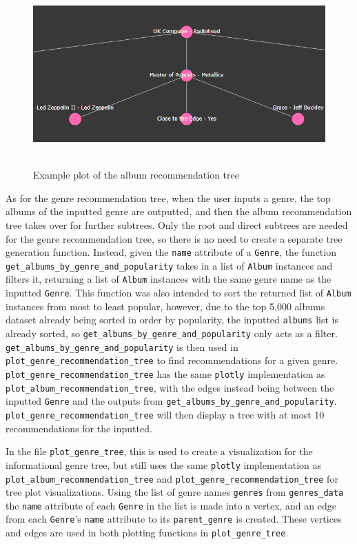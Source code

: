 \documentclass[fontsize=11pt]{article}
\begin{document}
\begin{figure}[h]
    \centering
    \includegraphics[height=7cm, width=13cm]{exampletree.png}
    \caption{Example plot of the album recommendation tree}
    \label{fig:my_label}
\end{figure}

As for the genre recommendation tree, when the user inputs a genre, the top albums of the inputted genre are outputted, and then the album recommendation tree takes over for further subtrees. Only the root and direct subtrees are needed for the genre recommendation tree, so there is no need to create a separate tree generation function. Instead, given the \texttt{name} attribute of a \texttt{Genre}, the function \texttt{get\_albums\_by\_genre\_and\_popularity} takes in a list of \texttt{Album} instances and filters it, returning a list of \texttt{Album} instances with the same genre name as the inputted \texttt{Genre}. This function was also intended to sort the returned list of \texttt{Album} instances from most to least popular, however, due to the top 5,000 albums dataset already being sorted in order by popularity, the inputted \texttt{albums} list is already sorted, so \texttt{get\_albums\_by\_genre\_and\_popularity} only acts as a filter. \texttt{get\_albums\_by\_genre\_and\_popularity} is then used in \texttt{plot\_genre\_recommendation\_tree} to find recommendations for a given genre. \texttt{plot\_genre\_recommendation\_tree} has the same \texttt{plotly} implementation as \texttt{plot\_album\_recommendation\_tree}, with the edges instead being between the inputted \texttt{Genre} and the outputs from \texttt{get\_albums\_by\_genre\_and\_popularity}. \texttt{plot\_genre\_recommendation\_tree} will then display a tree with at most 10 recommendations for the inputted. \newline

In the file \texttt{plot\_genre\_tree}, this is used to create a visualization for the informational genre tree, but still uses the same \texttt{plotly} implementation as \texttt{plot\_album\_recommendation\_tree} and \texttt{plot\_genre\_recommendation\_tree} for tree plot visualizations. Using the list of genre names \texttt{genres} from \texttt{genres\_data} the \texttt{name} attribute of each \texttt{Genre} in the list is made into a vertex, and an edge from each \texttt{Genre}'s \texttt{name} attribute to its \texttt{parent\_genre} is created. These vertices and edges are used in both plotting functions in \texttt{plot\_genre\_tree}.
\end{document}

